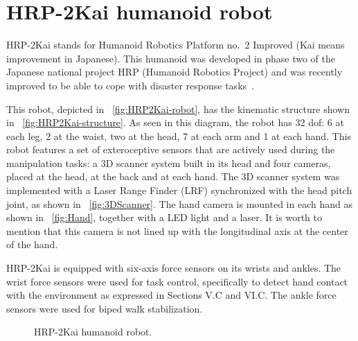 \section{HRP-2Kai humanoid robot}
	\label{sec:hrp2kai}
	
	HRP-2Kai stands for Humanoid Robotics Platform no.~2 Improved (Kai means improvement in Japanese).
	This humanoid was developed in phase two of the Japanese national project HRP
	(Humanoid Robotics Project) and was recently improved to be able to cope with disaster response
	tasks~\cite{Kaneko}.
	
	This robot, depicted in \figurename~\ref{fig:HRP2Kai-robot}, has the kinematic structure shown
	in \figurename~\ref{fig:HRP2Kai-structure}.
	As seen in this diagram, the robot has 32 dof:
	6 at each leg, 2 at the waist, two at the head, 7 at each arm and 1 at each hand.
	This robot features a set of exteroceptive sensors that are actively used during the manipulation
	tasks: a 3D scanner system built in its head and four cameras, placed at the head, at the back and
	at each hand.
	The 3D scanner system was implemented with a Laser Range Finder (LRF) synchronized with the head
	pitch joint, as shown in \figurename~\ref{fig:3DScanner}.
	The hand camera is mounted in each hand as shown in \figurename~\ref{fig:Hand}, together with a
	LED light and a laser.
	It is worth to mention that this camera is not lined up with the longitudinal axis at the center
	of the hand.

        HRP-2Kai is equipped with six-axis force sensors on its wrists and ankles. The wrist force sensors 
        were used for task control, specifically to detect hand contact with the environment as expressed in 
        Sections V.C and VI.C. The ankle force sensors were used for biped walk stabilization.
	
	\begin{figure}[t]
		\begin{center}
			\hspace{1cm}
		\end{center}
		\caption{HRP-2Kai humanoid robot.}
		\label{fig:HRP2Kai}
	\end{figure}
	
